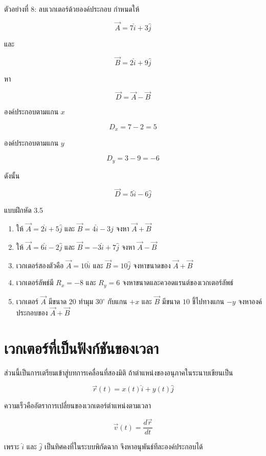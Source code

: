 \begin{examplebox}{ตัวอย่างที่ 8: ลบเวกเตอร์ด้วยองค์ประกอบ}
กำหนดให้

\[
\vec{A}=7\hat{i}+3\hat{j}
\]

และ

\[
\vec{B}=2\hat{i}+9\hat{j}
\]

หา

\[
\vec{D}=\vec{A}-\vec{B}
\]

องค์ประกอบตามแกน $x$

\[
D_x=7-2=5
\]

องค์ประกอบตามแกน $y$

\[
D_y=3-9=-6
\]

ดังนั้น

\[
\vec{D}=5\hat{i}-6\hat{j}
\]
\end{examplebox}

\begin{exercisebox}{แบบฝึกหัด 3.5}
\begin{enumerate}
    \item ให้ $\vec{A}=2\hat{i}+5\hat{j}$ และ $\vec{B}=4\hat{i}-3\hat{j}$ จงหา $\vec{A}+\vec{B}$
    \item ให้ $\vec{A}=6\hat{i}-2\hat{j}$ และ $\vec{B}=-3\hat{i}+7\hat{j}$ จงหา $\vec{A}-\vec{B}$
    \item เวกเตอร์สองตัวคือ $\vec{A}=10\hat{i}$ และ $\vec{B}=10\hat{j}$ จงหาขนาดของ $\vec{A}+\vec{B}$
    \item เวกเตอร์ลัพธ์มี $R_x=-8$ และ $R_y=6$ จงหาขนาดและควอดแรนต์ของเวกเตอร์ลัพธ์
    \item เวกเตอร์ $\vec{A}$ มีขนาด $20$ ทำมุม $30^\circ$ กับแกน $+x$ และ $\vec{B}$ มีขนาด $10$ ชี้ไปทางแกน $-y$ จงหาองค์ประกอบของ $\vec{A}+\vec{B}$
\end{enumerate}
\end{exercisebox}

\section{เวกเตอร์ที่เป็นฟังก์ชันของเวลา}

ส่วนนี้เป็นการเตรียมเข้าสู่บทการเคลื่อนที่สองมิติ ถ้าตำแหน่งของอนุภาคในระนาบเขียนเป็น

\[
\vec{r}(t)=x(t)\hat{i}+y(t)\hat{j}
\]

ความเร็วคืออัตราการเปลี่ยนของเวกเตอร์ตำแหน่งตามเวลา

\[
\vec{v}(t)=\frac{d\vec{r}}{dt}
\]

เพราะ $\hat{i}$ และ $\hat{j}$ เป็นทิศคงที่ในระบบพิกัดฉาก จึงหาอนุพันธ์ทีละองค์ประกอบได้

